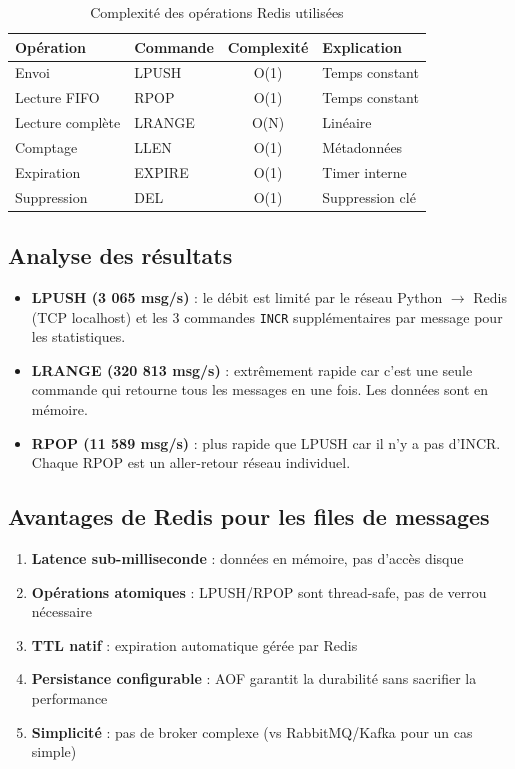 \documentclass[12pt,a4paper]{article}
\begin{document}
\begin{table}[H]
\centering
\begin{tabular}{|l|l|c|l|}
\hline
\textbf{Op\'eration} & \textbf{Commande} & \textbf{Complexit\'e} & \textbf{Explication} \\
\hline
Envoi & LPUSH & O(1) & Temps constant \\
Lecture FIFO & RPOP & O(1) & Temps constant \\
Lecture compl\`ete & LRANGE & O(N) & Lin\'eaire \\
Comptage & LLEN & O(1) & M\'etadonn\'ees \\
Expiration & EXPIRE & O(1) & Timer interne \\
Suppression & DEL & O(1) & Suppression cl\'e \\
\hline
\end{tabular}
\caption{Complexit\'e des op\'erations Redis utilis\'ees}
\end{table}

\subsection{Analyse des r\'esultats}

\begin{itemize}
    \item \textbf{LPUSH (3 065 msg/s)} : le d\'ebit est limit\'e par le r\'eseau Python $\rightarrow$ Redis (TCP localhost) et les 3 commandes \texttt{INCR} suppl\'ementaires par message pour les statistiques.
    \item \textbf{LRANGE (320 813 msg/s)} : extr\^emement rapide car c'est une seule commande qui retourne tous les messages en une fois. Les donn\'ees sont en m\'emoire.
    \item \textbf{RPOP (11 589 msg/s)} : plus rapide que LPUSH car il n'y a pas d'INCR. Chaque RPOP est un aller-retour r\'eseau individuel.
\end{itemize}

\subsection{Avantages de Redis pour les files de messages}

\begin{enumerate}
    \item \textbf{Latence sub-milliseconde} : donn\'ees en m\'emoire, pas d'acc\`es disque
    \item \textbf{Op\'erations atomiques} : LPUSH/RPOP sont thread-safe, pas de verrou n\'ecessaire
    \item \textbf{TTL natif} : expiration automatique g\'er\'ee par Redis
    \item \textbf{Persistance configurable} : AOF garantit la durabilit\'e sans sacrifier la performance
    \item \textbf{Simplicit\'e} : pas de broker complexe (vs RabbitMQ/Kafka pour un cas simple)
\end{enumerate}
\end{document}
